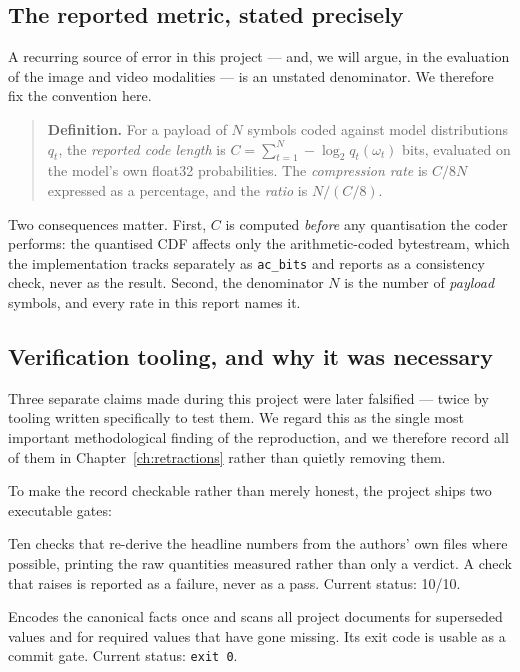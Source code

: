 \documentclass[11pt,a4paper]{article}
\newcommand{\code}[1]{\texttt{\small #1}}
\newcommand{\file}[1]{\texttt{\footnotesize\detokenize{#1}}}
\begin{document}
\subsection{The reported metric, stated precisely}

A recurring source of error in this project --- and, we will argue, in the
evaluation of the image and video modalities --- is an unstated denominator. We
therefore fix the convention here.

\begin{quote}
\textbf{Definition.} For a payload of $N$ symbols coded against model
distributions $q_t$, the \emph{reported code length} is
$C = \sum_{t=1}^{N} -\log_2 q_t(\omega_t)$ bits, evaluated on the model's own
float32 probabilities. The \emph{compression rate} is $C/8N$ expressed as a
percentage, and the \emph{ratio} is $N/(C/8)$.
\end{quote}

Two consequences matter. First, $C$ is computed \emph{before} any quantisation
the coder performs: the quantised CDF affects only the arithmetic-coded
bytestream, which the implementation tracks separately as \code{ac\_bits} and
reports as a consistency check, never as the result. Second, the denominator $N$
is the number of \emph{payload} symbols, and every rate in this report names it.

\subsection{Verification tooling, and why it was necessary}

Three separate claims made during this project were later falsified --- twice by
tooling written specifically to test them. We regard this as the single most
important methodological finding of the reproduction, and we therefore record all
of them in Chapter~\ref{ch:retractions} rather than quietly removing them.

To make the record checkable rather than merely honest, the project ships two
executable gates:

\begin{description}[leftmargin=1.4em,itemsep=2pt]
\item[\file{tools/review\_harness.py}] Ten checks that re-derive the headline
  numbers from the authors' own files where possible, printing the raw quantities
  measured rather than only a verdict. A check that raises is reported as a
  failure, never as a pass. Current status: \num{10}/\num{10}.
\item[\file{tools/check\_doc\_consistency.py}] Encodes the canonical facts once
  and scans all project documents for superseded values and for required values
  that have gone missing. Its exit code is usable as a commit gate. Current
  status: \code{exit 0}.
\end{description}
\end{document}
